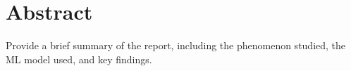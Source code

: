 \section*{Abstract}
Provide a brief summary of the report, including the phenomenon studied, the ML model used, and key findings.